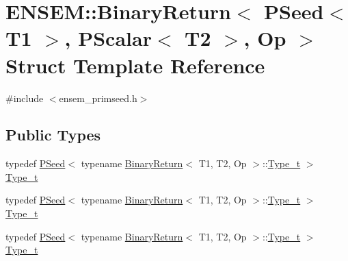 \hypertarget{structENSEM_1_1BinaryReturn_3_01PSeed_3_01T1_01_4_00_01PScalar_3_01T2_01_4_00_01Op_01_4}{}\section{E\+N\+S\+EM\+:\+:Binary\+Return$<$ P\+Seed$<$ T1 $>$, P\+Scalar$<$ T2 $>$, Op $>$ Struct Template Reference}
\label{structENSEM_1_1BinaryReturn_3_01PSeed_3_01T1_01_4_00_01PScalar_3_01T2_01_4_00_01Op_01_4}


{\ttfamily \#include $<$ensem\+\_\+primseed.\+h$>$}

\subsection*{Public Types}
\begin{DoxyCompactItemize}
\item 
typedef \mbox{\hyperlink{classENSEM_1_1PSeed}{P\+Seed}}$<$ typename \mbox{\hyperlink{structENSEM_1_1BinaryReturn}{Binary\+Return}}$<$ T1, T2, Op $>$\+::\mbox{\hyperlink{structENSEM_1_1BinaryReturn_3_01PSeed_3_01T1_01_4_00_01PScalar_3_01T2_01_4_00_01Op_01_4_a4130a6d592ca5e069c711c81b422aa54}{Type\+\_\+t}} $>$ \mbox{\hyperlink{structENSEM_1_1BinaryReturn_3_01PSeed_3_01T1_01_4_00_01PScalar_3_01T2_01_4_00_01Op_01_4_a4130a6d592ca5e069c711c81b422aa54}{Type\+\_\+t}}
\item 
typedef \mbox{\hyperlink{classENSEM_1_1PSeed}{P\+Seed}}$<$ typename \mbox{\hyperlink{structENSEM_1_1BinaryReturn}{Binary\+Return}}$<$ T1, T2, Op $>$\+::\mbox{\hyperlink{structENSEM_1_1BinaryReturn_3_01PSeed_3_01T1_01_4_00_01PScalar_3_01T2_01_4_00_01Op_01_4_a4130a6d592ca5e069c711c81b422aa54}{Type\+\_\+t}} $>$ \mbox{\hyperlink{structENSEM_1_1BinaryReturn_3_01PSeed_3_01T1_01_4_00_01PScalar_3_01T2_01_4_00_01Op_01_4_a4130a6d592ca5e069c711c81b422aa54}{Type\+\_\+t}}
\item 
typedef \mbox{\hyperlink{classENSEM_1_1PSeed}{P\+Seed}}$<$ typename \mbox{\hyperlink{structENSEM_1_1BinaryReturn}{Binary\+Return}}$<$ T1, T2, Op $>$\+::\mbox{\hyperlink{structENSEM_1_1BinaryReturn_3_01PSeed_3_01T1_01_4_00_01PScalar_3_01T2_01_4_00_01Op_01_4_a4130a6d592ca5e069c711c81b422aa54}{Type\+\_\+t}} $>$ \mbox{\hyperlink{structENSEM_1_1BinaryReturn_3_01PSeed_3_01T1_01_4_00_01PScalar_3_01T2_01_4_00_01Op_01_4_a4130a6d592ca5e069c711c81b422aa54}{Type\+\_\+t}}
\end{DoxyCompactItemize}


